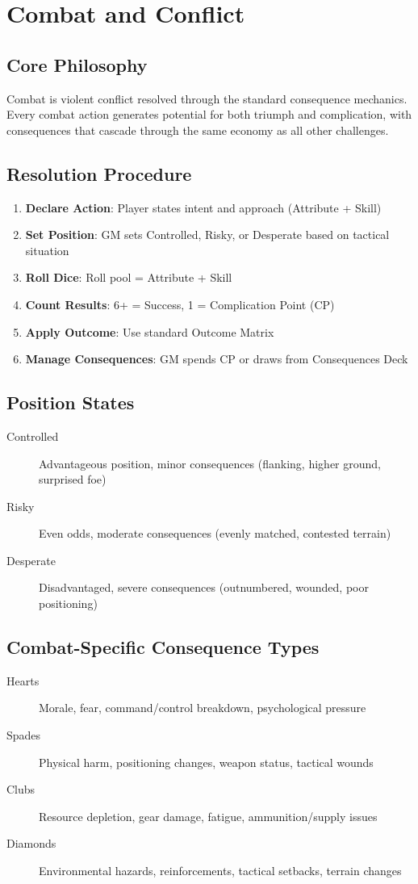 \chapter{Combat and Conflict}

\section{Core Philosophy}
Combat is violent conflict resolved through the standard consequence mechanics. Every combat action generates potential for both triumph and complication, with consequences that cascade through the same economy as all other challenges.

\section{Resolution Procedure}
\begin{enumerate}
    \item \textbf{Declare Action}: Player states intent and approach (Attribute + Skill)
    \item \textbf{Set Position}: GM sets Controlled, Risky, or Desperate based on tactical situation
    \item \textbf{Roll Dice}: Roll pool = Attribute + Skill
    \item \textbf{Count Results}: 6+ = Success, 1 = Complication Point (CP)
    \item \textbf{Apply Outcome}: Use standard Outcome Matrix
    \item \textbf{Manage Consequences}: GM spends CP or draws from Consequences Deck
\end{enumerate}

\section{Position States}
\begin{description}
\item[Controlled] Advantageous position, minor consequences (flanking, higher ground, surprised foe)
\item[Risky] Even odds, moderate consequences (evenly matched, contested terrain)
\item[Desperate] Disadvantaged, severe consequences (outnumbered, wounded, poor positioning)
\end{description}

\section{Combat-Specific Consequence Types}
\begin{description}
\item[Hearts] Morale, fear, command/control breakdown, psychological pressure
\item[Spades] Physical harm, positioning changes, weapon status, tactical wounds
\item[Clubs] Resource depletion, gear damage, fatigue, ammunition/supply issues
\item[Diamonds] Environmental hazards, reinforcements, tactical setbacks, terrain changes
\end{description}

